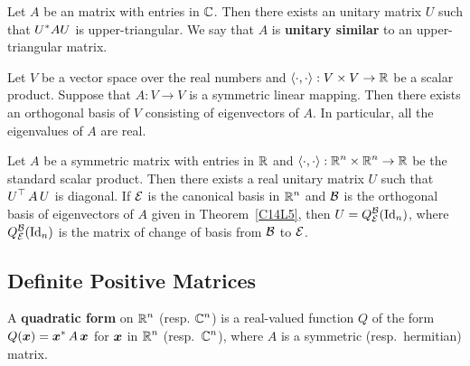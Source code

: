 \begin{theorem}
Let $A$ be an \nn matrix with entries in $\mathbb{C}$.  Then there exists an
unitary matrix $U$ such that $\displaystyle U^\ast A U$ is
upper-triangular.  We say that
$A$ is {\bfseries unitary similar} to
an upper-triangular matrix.
\end{theorem}

\begin{theorem}
Let $V$ be a vector space over the real numbers and
$\left\langle{\cdot} , {\cdot}\right\rangle:V \times V \rightarrow \mathbb{R}$ be a scalar product.  Suppose
that $A:V \rightarrow V$ is a symmetric linear mapping.  Then there exists an
orthogonal basis of $V$ consisting of eigenvectors of $A$.  In particular,
all the eigenvalues of $A$ are real.
\label{C14L5}
\end{theorem}

\begin{cor}
Let $A$ be a \nn symmetric matrix with entries in $\mathbb{R}$ and
$\displaystyle \left\langle{\cdot} , {\cdot}\right\rangle:\mathbb{R}^n \times \mathbb{R}^n \to \mathbb{R}$ be the
standard scalar product.  Then there exists a real unitary matrix $U$
such that $\displaystyle U^{\top}\,A\,U$ is diagonal.  If $\mathcal{E}$ is the
canonical basis in $\displaystyle \mathbb{R}^n$ and $\mathcal{B}$ is the orthogonal
basis of eigenvectors of $A$ given in Theorem~\ref{C14L5},  then
$\displaystyle U = Q_{\mathcal{E}}^{\mathcal{B}}(\operatorname{Id}_n)$, where
$\displaystyle Q_{\mathcal{E}}^{\mathcal{B}}(\operatorname{Id}_n)$ is the matrix of change of basis from $\mathcal{B}$ to
$\mathcal{E}$.
\end{cor}

\subsection{Definite Positive Matrices}

\begin{defn}
A {\bfseries quadratic form} on $\displaystyle \mathbb{R}^n$
(resp. $\displaystyle \mathbb{C}^n$) is a real-valued function $Q$ of the form
$\displaystyle Q(\bm{x}) = \bm{x}^\ast \,A\,\bm{x}$ for
$\bm{x}$ in $\displaystyle \mathbb{R}^n$ (resp.\ $\displaystyle \mathbb{C}^n$),
where $A$ is a \nn symmetric (resp.\ hermitian) matrix.
\end{defn}

